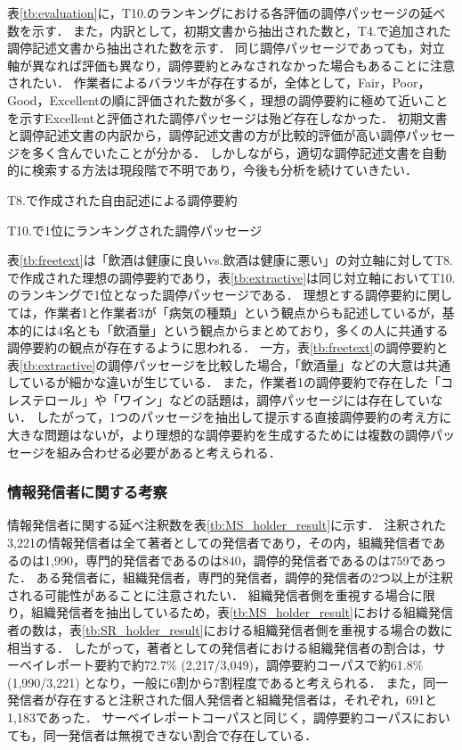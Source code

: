 \documentclass[japanese]{jnlp_1.4}
\begin{document}
表\ref{tb:evaluation}に，T10.のランキングにおける各評価の調停パッセージの延べ数を示す．
\pagebreak
また，内訳として，初期文書から抽出された数と，T4.で追加された調停記述文書から抽出された数を示す．
同じ調停パッセージであっても，対立軸が異なれば評価も異なり，調停要約とみなされなかった場合もあることに注意されたい．
作業者によるバラツキが存在するが，全体として，{\sf Fair}，{\sf Poor}，{\sf Good}，{\sf Excellent}の順に評価された数が多く，理想の調停要約に極めて近いことを示す{\sf Excellent}と評価された調停パッセージは殆ど存在しなかった．
初期文書と調停記述文書の内訳から，調停記述文書の方が比較的評価が高い調停パッセージを多く含んでいたことが分かる．
しかしながら，適切な調停記述文書を自動的に検索する方法は現段階で不明であり，今後も分析を続けていきたい．

\begin{table}[t]
 \caption{T8.で作成された自由記述による調停要約}
 \label{tb:freetext}

\end{table}

\begin{table}[t]
 \caption{T10.で1位にランキングされた調停パッセージ}
 \label{tb:extractive}

\end{table}

表\ref{tb:freetext}は「飲酒は健康に良いvs.飲酒は健康に悪い」の対立軸に対してT8.で作成された理想の調停要約であり，表\ref{tb:extractive}は同じ対立軸においてT10.のランキングで1位となった調停パッセージである．
理想とする調停要約に関しては，作業者1と作業者3が「病気の種類」という観点からも記述しているが，基本的には4名とも「飲酒量」という観点からまとめており，多くの人に共通する調停要約の観点が存在するように思われる．
一方，表\ref{tb:freetext}の調停要約と表\ref{tb:extractive}の調停パッセージを比較した場合，「飲酒量」などの大意は共通しているが細かな違いが生じている．
また，作業者1の調停要約で存在した「コレステロール」や「ワイン」などの話題は，調停パッセージには存在していない．
したがって，1つのパッセージを抽出して提示する直接調停要約の考え方に大きな問題はないが，より理想的な調停要約を生成するためには複数の調停パッセージを組み合わせる必要があると考えられる．


\subsubsection{情報発信者に関する考察}

{情報}発信者に関する延べ注釈数を表\ref{tb:MS_holder_result}に示す．
注釈された3,221の情報発信者は全て著者としての発信者であり，その内，組織発信者であるのは1,990，専門的発信者であるのは840，調停的発信者であるのは759であった．
ある発信者に，組織発信者，専門的発信者，調停的発信者の2つ以上が注釈される可能性があることに注意されたい．
組織発信者{側}を重視する場合に限り，組織発信者を抽出しているため，表\ref{tb:MS_holder_result}における組織発信者の数は，表\ref{tb:SR_holder_result}における組織発信者{側}を重視する場合の数に相当する．
したがって，著者としての発信者における組織発信者の割合は，サーベイレポート要約で約72.7\% (2,217/3,049)，調停要約コーパスで約61.8\% (1,990/3,221) となり，一般に6割から7割程度であると考えられる．
また，同一発信者が存在すると注釈された個人発信者と組織発信者は，それぞれ，691と1,183であった．
サーベイレポートコーパスと同じく，調停要約コーパスにおいても，同一発信者は無視できない割合で存在している．
\end{document}

